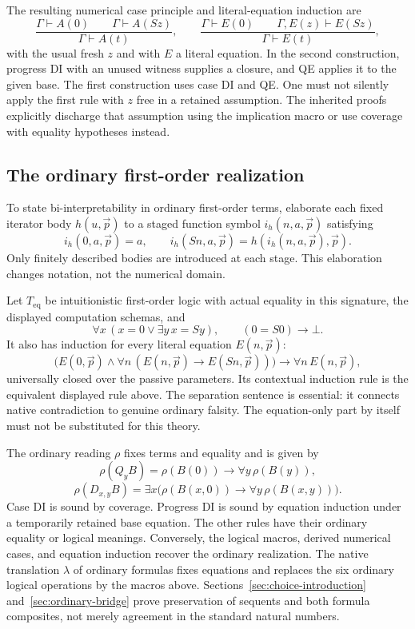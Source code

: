 \documentclass[11pt,letterpaper]{article}
\theoremstyle{definition}
\theoremstyle{remark}
\begin{document}
The resulting numerical case principle and literal-equation induction are
\[
 \frac{\Gamma\vdash A(0)\qquad\Gamma\vdash A(Sz)}
      {\Gamma\vdash A(t)},
 \qquad
 \frac{\Gamma\vdash E(0)\qquad\Gamma,E(z)\vdash E(Sz)}
      {\Gamma\vdash E(t)},
\]
with the usual fresh $z$ and with $E$ a literal equation. In the second
construction, progress DI with an unused witness supplies a closure, and QE
applies it to the given base. The first construction uses case DI and QE.
One must not silently apply the first rule with $z$ free in a retained
assumption. The inherited proofs explicitly discharge that assumption using
the implication macro or use coverage with equality hypotheses instead.

\subsection{The ordinary first-order realization}

To state bi-interpretability in ordinary first-order terms, elaborate each
fixed iterator body $h(u,\vec p)$ to a staged function symbol
$i_h(n,a,\vec p)$ satisfying
\[
 i_h(0,a,\vec p)=a,\qquad
 i_h(Sn,a,\vec p)=h(i_h(n,a,\vec p),\vec p).
\]
Only finitely described bodies are introduced at each stage. This elaboration
changes notation, not the numerical domain.

Let $T_{\mathrm{eq}}$ be intuitionistic first-order logic with actual equality
in this signature, the displayed computation schemas, and
\[
 \forall x\,(x=0\vee\exists y\,x=Sy),
 \qquad (0=S0)\to\bot.
\]
It also has induction for every literal equation $E(n,\vec p)$:
\[
 \bigl(E(0,\vec p)\wedge
       \forall n\,(E(n,\vec p)\to E(Sn,\vec p))\bigr)
       \to\forall n\,E(n,\vec p),
\]
universally closed over the passive parameters. Its contextual induction
rule is the equivalent displayed rule above. The separation sentence is
essential: it connects native contradiction to genuine ordinary falsity.
The equation-only part by itself must not be substituted for this theory.

The ordinary reading $\rho$ fixes terms and equality and is given by
\[
 \rho(Q_yB)=\rho(B(0))\to\forall y\,\rho(B(y)),
\]
\[
 \rho(D_{x,y}B)=
   \exists x\bigl(\rho(B(x,0))\to\forall y\,\rho(B(x,y))\bigr).
\]
Case DI is sound by coverage. Progress DI is sound by equation induction
under a temporarily retained base equation. The other rules have their
ordinary equality or logical meanings. Conversely, the logical macros,
derived numerical cases, and equation induction recover the ordinary
realization. The native translation $\lambda$ of ordinary formulas fixes
equations and replaces the six ordinary logical operations by the macros
above. Sections~\ref{sec:choice-introduction} and~\ref{sec:ordinary-bridge}
prove preservation of sequents and both formula composites, not merely
agreement in the standard natural numbers.
\end{document}

